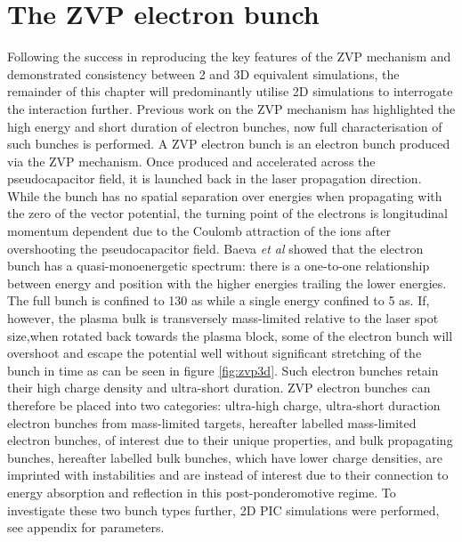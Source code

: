 
\section{The ZVP electron bunch}\label{sec:zvp-bunches}
Following the success in reproducing the key features of the \ac{ZVP} mechanism and demonstrated consistency between 2 and 3D equivalent simulations, the remainder of this chapter will predominantly utilise 2D simulations to interrogate the interaction further. Previous work on the ZVP mechanism has highlighted the high energy and short duration of electron bunches, now full characterisation of such bunches is performed. A ZVP electron bunch is an electron bunch produced via the ZVP mechanism. Once produced and accelerated across the pseudocapacitor field, it is launched back in the laser propagation direction. While the bunch has no spatial separation over energies when propagating with the zero of the vector potential, the turning point of the electrons is longitudinal momentum dependent due to the Coulomb attraction of the ions after overshooting the pseudocapacitor field. Baeva \textit{et al} showed that the electron bunch has a quasi-monoenergetic spectrum: there is a one-to-one relationship between energy and position with the higher energies trailing the lower energies. The full bunch is confined to 130 as while a single energy confined to 5 as. If, however, the plasma bulk is transversely mass-limited relative to the laser spot size,when rotated back towards the plasma block, some of the electron bunch will overshoot and escape the potential well without significant stretching of the bunch in time as can be seen in figure \ref{fig:zvp3d}. Such electron bunches retain their high charge density and ultra-short duration. ZVP electron bunches can therefore be placed into two categories: ultra-high charge, ultra-short duraction electron bunches from mass-limited targets, hereafter labelled mass-limited electron bunches, of interest due to their unique properties, and bulk propagating bunches, hereafter labelled bulk bunches, which have lower charge densities, are imprinted with instabilities and are instead of interest due to their connection to energy absorption and reflection in this post-ponderomotive regime. To investigate these two bunch types further, 2D PIC simulations were performed, see appendix for parameters.
 
